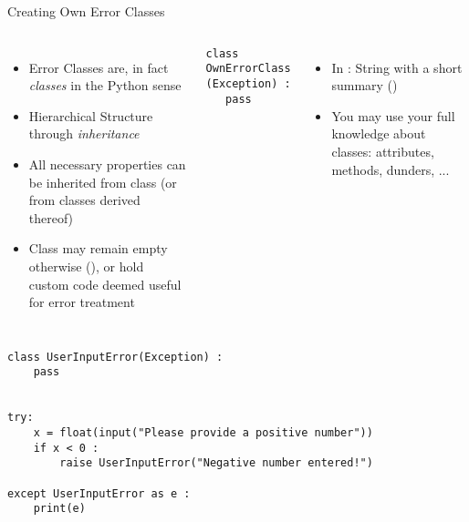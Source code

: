 
\begin{frame}[fragile]{Creating Own Error Classes}
%
\begin{columns}[T]
\begin{itemize}
\item Error Classes are, in fact \emph{classes} in the Python sense
\item Hierarchical Structure through \emph{inheritance}
\item All necessary properties can be inherited from class  (or from classes derived thereof)
\item Class may remain empty otherwise (), or hold custom code deemed useful for error treatment
\end{itemize}
%
\vspace{-6pt}
\begin{codebox}
\begin{verbatim}
class OwnErrorClass (Exception) :
   pass
\end{verbatim}
\end{codebox}
%
\begin{itemize}
\item In : String with a short summary ()
\item You may use your full knowledge about classes: attributes, methods, dunders, ...
\end{itemize}
%
\end{columns}
%
\end{frame}


\begin{frame}[fragile]
%
\begin{codebox}
\begin{verbatim}
class UserInputError(Exception) :
    pass


try:
    x = float(input("Please provide a positive number"))
    if x < 0 :
        raise UserInputError("Negative number entered!")

except UserInputError as e :
    print(e)
\end{verbatim}
\end{codebox}
%
\end{frame}